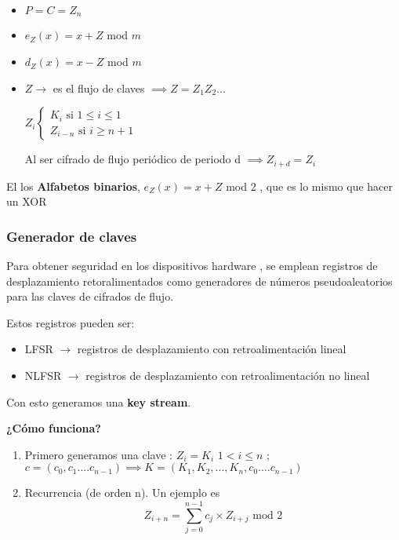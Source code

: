 \begin{example}
	\begin{itemize}
		\item $P= C = Z_n$
		\item $e_Z(x) = x + Z$ mod $m$
		\item $d_Z(x) = x - Z$ mod $m$
		\item $Z \rightarrow$ es el flujo de claves $\implies Z = Z_1Z_2...$
		
		$Z_i \begin{cases}
			K_i \text{ si } 1 \leq i \leq 1\\
			Z_{i-n} \text{ si } i \geq n+1
		\end{cases}$ 
		
		Al ser cifrado de flujo periódico de periodo d $\implies Z_{i+d} = Z_i$ 
	\end{itemize}
	\begin{remark}
		El los \textbf{Alfabetos binarios},  $e_Z(x) = x + Z$ mod $2$ , que es lo mismo que hacer un XOR
	\end{remark}
\end{example}




\subsubsection{Generador de claves}

 Para obtener seguridad en los dispositivos hardware , se emplean registros de desplazamiento retoralimentados como generadores de números pseudoaleatorios para las claves de cifrados de flujo.
 
 Estos registros pueden ser:
 
\begin{itemize}
	\item LFSR $\rightarrow$ registros de desplazamiento con retroalimentación lineal
	\item NLFSR $\rightarrow$ registros de desplazamiento con retroalimentación no lineal
\end{itemize}

Con esto generamos una \textbf{key stream}.

\textbf{¿Cómo funciona?}
\begin{enumerate}
	\item Primero generamos una clave : $Z_i = K_i$  $1< i \leq n$ ; $c = (c_0, c_1....c_{n-1}) \implies K = (K_1, K_2,..., K_n,c_0....c_{n-1})$
	\item Recurrencia (de orden n). Un ejemplo es
	$$Z_{i+n} = \sum_{j=0}^{n-1} c_j \times Z_{i+j} \text{ mod } 2$$
\end{enumerate}

